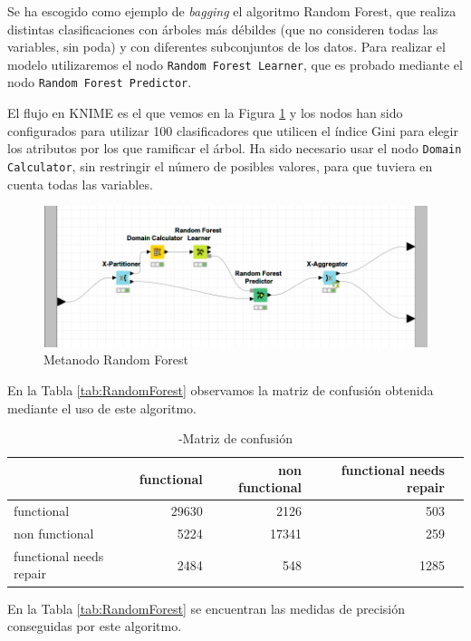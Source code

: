 \documentclass[a4paper, 20pt]{article}
\begin{document}
Se ha escogido como ejemplo de \textit{bagging} el algoritmo Random Forest, que realiza distintas clasificaciones con árboles más débildes (que no consideren todas las variables, sin poda) y con diferentes subconjuntos de los datos. Para realizar el modelo utilizaremos el nodo \texttt{Random Forest Learner}, que es probado mediante el nodo \texttt{Random Forest Predictor}. 

El flujo en KNIME es el que vemos en la Figura \ref{fig:RandomForest} y los nodos han sido configurados para utilizar 100 clasificadores que utilicen el índice Gini para elegir los atributos por los que ramificar el árbol. Ha sido necesario usar el nodo \texttt{Domain Calculator}, sin restringir el número de posibles valores, para que tuviera en cuenta todas las variables.

\begin{figure}[H]
    \centering
    \includegraphics[width=1\textwidth]{RandomForest}
    \caption{Metanodo Random Forest}
    \label{fig:RandomForest}
\end{figure}

En la Tabla \ref{tab:RandomForest} observamos la matriz de confusión obtenida mediante el uso de este algoritmo.

\begin{table}[H]
\centering
\caption{-Matriz de confusión}
\label{tab:CMRandomForest}
\begin{tabular}{lrrrr}
\toprule
 & functional & non functional & functional needs repair\\ \midrule
functional & 29630 & 2126 & 503\\
non functional & 5224 & 17341 & 259\\
functional needs repair & 2484 & 548 & 1285\\
\bottomrule
\end{tabular}
\end{table}

En la Tabla \ref{tab:RandomForest} se encuentran las medidas de precisión conseguidas por este algoritmo.
\end{document}
